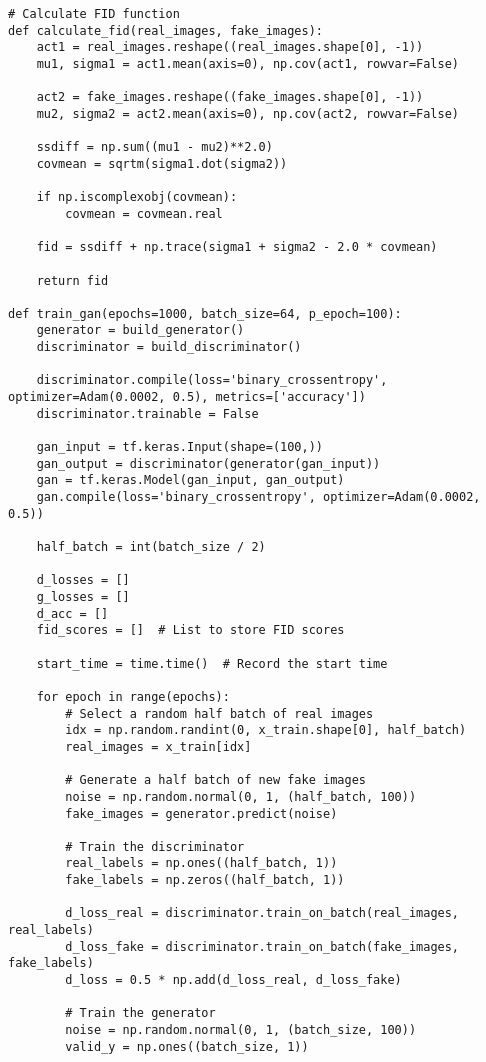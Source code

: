 \begin{lstlisting}[style=mypython, caption=GAN Model with Dense Layers]
# Calculate FID function
def calculate_fid(real_images, fake_images):
    act1 = real_images.reshape((real_images.shape[0], -1))
    mu1, sigma1 = act1.mean(axis=0), np.cov(act1, rowvar=False)
    
    act2 = fake_images.reshape((fake_images.shape[0], -1))
    mu2, sigma2 = act2.mean(axis=0), np.cov(act2, rowvar=False)
    
    ssdiff = np.sum((mu1 - mu2)**2.0)
    covmean = sqrtm(sigma1.dot(sigma2))
    
    if np.iscomplexobj(covmean):
        covmean = covmean.real
    
    fid = ssdiff + np.trace(sigma1 + sigma2 - 2.0 * covmean)
    
    return fid

def train_gan(epochs=1000, batch_size=64, p_epoch=100):
    generator = build_generator()
    discriminator = build_discriminator()

    discriminator.compile(loss='binary_crossentropy', optimizer=Adam(0.0002, 0.5), metrics=['accuracy'])
    discriminator.trainable = False

    gan_input = tf.keras.Input(shape=(100,))
    gan_output = discriminator(generator(gan_input))
    gan = tf.keras.Model(gan_input, gan_output)
    gan.compile(loss='binary_crossentropy', optimizer=Adam(0.0002, 0.5))

    half_batch = int(batch_size / 2)
    
    d_losses = []
    g_losses = []
    d_acc = []
    fid_scores = []  # List to store FID scores
    
    start_time = time.time()  # Record the start time

    for epoch in range(epochs):
        # Select a random half batch of real images
        idx = np.random.randint(0, x_train.shape[0], half_batch)
        real_images = x_train[idx]

        # Generate a half batch of new fake images
        noise = np.random.normal(0, 1, (half_batch, 100))
        fake_images = generator.predict(noise)

        # Train the discriminator
        real_labels = np.ones((half_batch, 1))
        fake_labels = np.zeros((half_batch, 1))

        d_loss_real = discriminator.train_on_batch(real_images, real_labels)
        d_loss_fake = discriminator.train_on_batch(fake_images, fake_labels)
        d_loss = 0.5 * np.add(d_loss_real, d_loss_fake)

        # Train the generator
        noise = np.random.normal(0, 1, (batch_size, 100))
        valid_y = np.ones((batch_size, 1))


\end{lstlisting}
